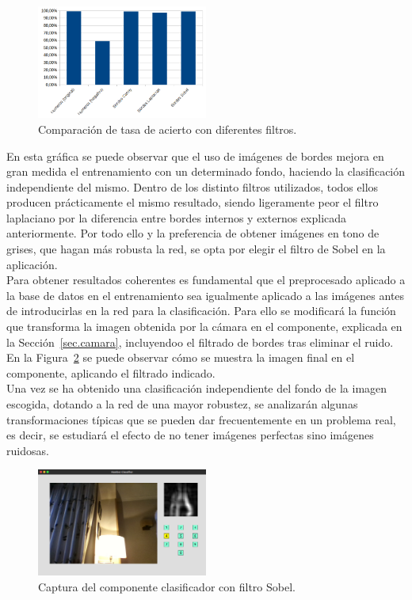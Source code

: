 \begin{figure}[H]
	\begin{center}
		\includegraphics[width=0.5\textwidth]{figures/filtros}
		\caption{Comparación de tasa de acierto con diferentes filtros.}
		\label{fig.filtros}
	\end{center}
\end{figure}

En esta gráfica se puede observar que el uso de imágenes de bordes mejora en gran medida el entrenamiento con un determinado fondo, haciendo la clasificación independiente del mismo. Dentro de los distinto filtros utilizados, todos ellos producen prácticamente el mismo resultado, siendo ligeramente peor el filtro laplaciano por la diferencia entre bordes internos y externos explicada anteriormente. Por todo ello y la preferencia de obtener imágenes en tono de grises, que hagan más robusta la red, se opta por elegir el filtro de Sobel en la aplicación.\\

Para obtener resultados coherentes es fundamental que el preprocesado aplicado a la base de datos en el entrenamiento sea igualmente aplicado a las imágenes antes de introducirlas en la red para la clasificación. Para ello se modificará la función que transforma la imagen obtenida por la cámara en el componente, explicada en la Sección~\ref{sec.camara}, incluyendoo el filtrado de bordes tras eliminar el ruido. En la Figura~\ref{fig.componente2} se puede observar cómo se muestra la imagen final en el componente, aplicando el filtrado indicado.\\

Una vez se ha obtenido una clasificación independiente del fondo de la imagen escogida, dotando a la red de una mayor robustez, se analizarán algunas transformaciones típicas que se pueden dar frecuentemente en un problema real, es decir, se estudiará el efecto de no tener imágenes perfectas sino imágenes ruidosas.

\begin{figure}[H]
	\begin{center}
		\includegraphics[width=0.5\textwidth]{figures/componente2}
		\caption{Captura del componente clasificador con filtro Sobel.}
		\label{fig.componente2}
	\end{center}
\end{figure}

